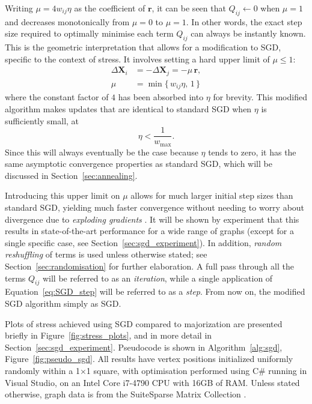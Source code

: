 Writing $\mu=4w_{ij}\eta$ as the coefficient of $\mathbf{r}$, it can be seen that $Q_{ij}\leftarrow 0$ when $\mu=1$ and decreases monotonically from $\mu=0$ to $\mu=1$.
In other words, the exact step size required to optimally minimise each term $Q_{ij}$ can always be instantly known. This is the geometric interpretation that allows for a modification to SGD, specific to the context of stress. It involves setting a hard upper limit of $\mu\leq 1$:
\begin{equation}
  \begin{aligned}
    \Delta\mathbf{X}_i &= -\Delta\mathbf{X}_j = -\mu\, \mathbf{r},\\
    \mu&=\min\{\,w_{ij}\eta, \, 1\,\}
  \end{aligned}
  \label{eq:mu}
\end{equation}
where the constant factor of $4$ has been absorbed into $\eta$ for brevity.
This modified algorithm makes updates that are identical to standard SGD when $\eta$ is sufficiently small, at
\begin{equation}
  \eta<\frac{1}{w_{\max}}.
  \label{eq:eta-sufficiently-small}
\end{equation}
Since this will always eventually be the case because $\eta$ tends to zero, it has the same asymptotic convergence properties as standard SGD, which will be discussed in Section~\ref{sec:annealing}.

Introducing this upper limit on $\mu$ allows for much larger initial step sizes than standard SGD, yielding much faster convergence without needing to worry about divergence due to \emph{exploding gradients} \cite{Goodfellow2016}. It will be shown by experiment that this results in state-of-the-art performance for a wide range of graphs (except for a single specific case, see Section~\ref{sec:sgd_experiment}).
In addition, \emph{random reshuffling} of terms is used unless otherwise stated; see Section~\ref{sec:randomisation} for further elaboration. A full pass through all the terms $Q_{ij}$ will be referred to as an \emph{iteration}, while a single application of Equation~\eqref{eq:SGD_step} will be referred to as a \emph{step}.
From now on, the modified SGD algorithm simply as SGD.

Plots of stress achieved using SGD compared to majorization are presented briefly in Figure~\ref{fig:stress_plots}, and in more detail in Section~\ref{sec:sgd_experiment}. Pseudocode is shown in Algorithm~\ref{alg:sgd}, Figure~\ref{fig:pseudo_sgd}.
All results have vertex positions initialized uniformly randomly within a 1$\times$1 square, with optimisation performed using C\# running in Visual Studio, on an Intel Core i7-4790 CPU with 16GB of RAM.
Unless stated otherwise, graph data is from the SuiteSparse Matrix Collection \cite{Davis2011}.

